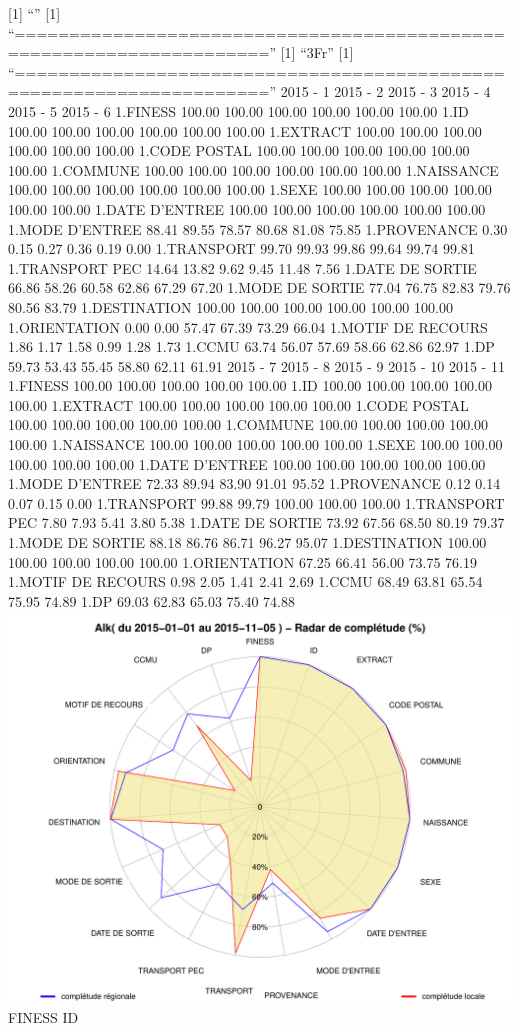 \documentclass[]{article}
\begin{document}
{[}1{]} ``'' {[}1{]}
``=====================================================================''
{[}1{]} ``3Fr'' {[}1{]}
``=====================================================================''
2015 - 1 2015 - 2 2015 - 3 2015 - 4 2015 - 5 2015 - 6 1.FINESS 100.00
100.00 100.00 100.00 100.00 100.00 1.ID 100.00 100.00 100.00 100.00
100.00 100.00 1.EXTRACT 100.00 100.00 100.00 100.00 100.00 100.00 1.CODE
POSTAL 100.00 100.00 100.00 100.00 100.00 100.00 1.COMMUNE 100.00 100.00
100.00 100.00 100.00 100.00 1.NAISSANCE 100.00 100.00 100.00 100.00
100.00 100.00 1.SEXE 100.00 100.00 100.00 100.00 100.00 100.00 1.DATE
D'ENTREE 100.00 100.00 100.00 100.00 100.00 100.00 1.MODE D'ENTREE 88.41
89.55 78.57 80.68 81.08 75.85 1.PROVENANCE 0.30 0.15 0.27 0.36 0.19 0.00
1.TRANSPORT 99.70 99.93 99.86 99.64 99.74 99.81 1.TRANSPORT PEC 14.64
13.82 9.62 9.45 11.48 7.56 1.DATE DE SORTIE 66.86 58.26 60.58 62.86
67.29 67.20 1.MODE DE SORTIE 77.04 76.75 82.83 79.76 80.56 83.79
1.DESTINATION 100.00 100.00 100.00 100.00 100.00 100.00 1.ORIENTATION
0.00 0.00 57.47 67.39 73.29 66.04 1.MOTIF DE RECOURS 1.86 1.17 1.58 0.99
1.28 1.73 1.CCMU 63.74 56.07 57.69 58.66 62.86 62.97 1.DP 59.73 53.43
55.45 58.80 62.11 61.91 2015 - 7 2015 - 8 2015 - 9 2015 - 10 2015 - 11
1.FINESS 100.00 100.00 100.00 100.00 100.00 1.ID 100.00 100.00 100.00
100.00 100.00 1.EXTRACT 100.00 100.00 100.00 100.00 100.00 1.CODE POSTAL
100.00 100.00 100.00 100.00 100.00 1.COMMUNE 100.00 100.00 100.00 100.00
100.00 1.NAISSANCE 100.00 100.00 100.00 100.00 100.00 1.SEXE 100.00
100.00 100.00 100.00 100.00 1.DATE D'ENTREE 100.00 100.00 100.00 100.00
100.00 1.MODE D'ENTREE 72.33 89.94 83.90 91.01 95.52 1.PROVENANCE 0.12
0.14 0.07 0.15 0.00 1.TRANSPORT 99.88 99.79 100.00 100.00 100.00
1.TRANSPORT PEC 7.80 7.93 5.41 3.80 5.38 1.DATE DE SORTIE 73.92 67.56
68.50 80.19 79.37 1.MODE DE SORTIE 88.18 86.76 86.71 96.27 95.07
1.DESTINATION 100.00 100.00 100.00 100.00 100.00 1.ORIENTATION 67.25
66.41 56.00 73.75 76.19 1.MOTIF DE RECOURS 0.98 2.05 1.41 2.41 2.69
1.CCMU 68.49 63.81 65.54 75.95 74.89 1.DP 69.03 62.83 65.03 75.40 74.88
\includegraphics{completude_files/figure-latex/finess-8.pdf} FINESS ID
\end{document}
